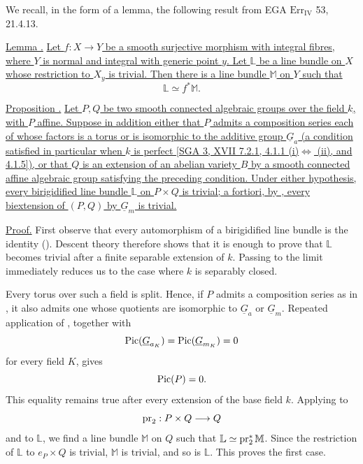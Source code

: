 
We recall, in the form of a lemma, the following result from EGA
$\mathrm{Err}_{\mathrm{IV}}$ 53, 21.4.13.

\medskip
\noindent\underline{Lemma .}  \underline{Let
$f:X\longrightarrow Y$ be a smooth surjective morphism with integral
fibres, where $Y$ is normal and integral with generic point $y$.  Let
$\mathbb L$ be a line bundle on $X$ whose restriction to $X_y$ is
trivial.  Then there is a line bundle $\mathbb M$ on $Y$ such that}
\[
 \mathbb L\simeq f^*\mathbb M.
\]

\medskip
\noindent\underline{Proposition .}  \underline{Let $P,Q$ be two
smooth connected algebraic groups over the field $k$, with $P$
affine.  Suppose in addition either that $P$ admits a composition
series each of whose factors is a torus or is isomorphic to the
additive group $\underline G_a$ (a condition satisfied in particular
when $k$ is perfect [SGA 3, XVII 7.2.1, 4.1.1 (i)$\Longleftrightarrow$
(ii), and 4.1.5]), or that $Q$ is an extension of an abelian variety
$B$ by a smooth connected affine algebraic group satisfying the
preceding condition.  Under either hypothesis, every birigidified
line bundle $\mathbb L$ on $P\times Q$ is trivial; a fortiori, by
, every biextension of $(P,Q)$ by $\underline G_m$ is trivial.}

\noindent\underline{Proof.}  First observe that every automorphism of
a birigidified line bundle is the identity ().  Descent theory
therefore shows that it is enough to prove that $\mathbb L$ becomes
trivial after a finite separable extension of $k$.  Passing to the
limit immediately reduces us to the case where $k$ is separably
closed.

Every torus over such a field is split.  Hence, if $P$ admits a
composition series as in , it also admits one whose quotients are
isomorphic to $\underline G_a$ or $\underline G_m$.  Repeated
application of , together with
\[
 \Pic(\underline G_{a_K})=\Pic(\underline G_{m_K})=0
\]
for every field $K$, gives
\[
 \operatorname{Pic}(P)=0.
\]
This equality remains true after every extension of the base field
$k$.  Applying  to
\[
 \operatorname{pr}_2:P\times Q\longrightarrow Q
\]
and to $\mathbb L$, we find a line bundle $\mathbb M$ on $Q$ such
that $\mathbb L\simeq\operatorname{pr}_2^*\mathbb M$.  Since the restriction of
$\mathbb L$ to $e_P\times Q$ is trivial, $\mathbb M$ is trivial, and
so is $\mathbb L$.  This proves the first case.


